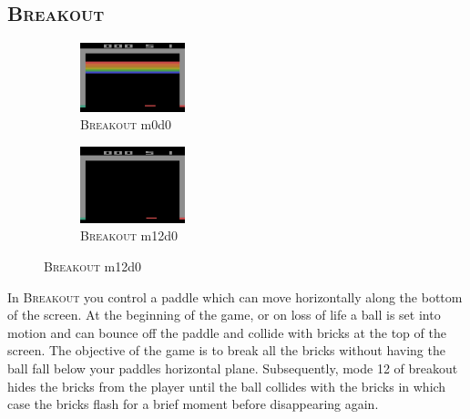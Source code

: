 \documentclass{article}
\begin{document}
\subsection*{\textsc{Breakout}}
\begin{figure}[h]
    \begin{subfigure}{0.49\linewidth}
    \centering
    \includegraphics[width=1.2in]{figures/alemodes/breakout_m0.png}
    \caption{\textsc{Breakout} m0d0}
    \end{subfigure}
    \begin{subfigure}{0.49\linewidth}
    \centering
    \includegraphics[width=1.2in]{figures/alemodes/breakout_m12.png}
    \caption{\textsc{Breakout} m12d0}
    \end{subfigure}
\end{figure}
In \textsc{Breakout} you control a paddle which can move horizontally along the bottom of the screen. At the beginning of the game, or on loss of life a ball is set into motion and can bounce off the paddle and collide with bricks at the top of the screen. The objective of the game is to break all the bricks without having the ball fall below your paddles horizontal plane.
Subsequently, mode 12 of breakout hides the bricks from the player until the ball collides with the bricks in which case the bricks flash for a brief moment before disappearing again.
\end{document}

